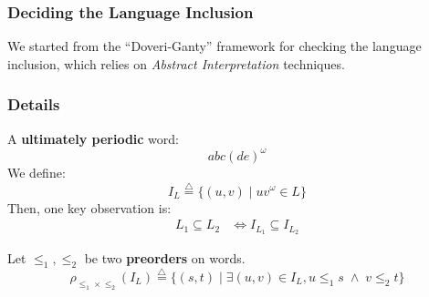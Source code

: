 \documentclass{beamer}
\begin{document}
\begin{frame}
\frametitle{Deciding the Language Inclusion}
We started from the ``Doveri-Ganty'' framework for checking the language inclusion,
which relies on \emph{Abstract Interpretation} techniques.

\begin{figure}[h]
	\centering
\end{figure}
\end{frame}



\begin{frame}
\frametitle{Details}
A \textbf{ultimately periodic} word:
\[ abc(de)^{\omega} \]
We define:
\[ I_{L} \overset{\triangle}{=} \{ (u,v) \;|\; uv ^{\omega} \in L\} \]
Then, one key observation is:
\begin{equation*}
\begin{split}
L_1 \subseteq L_2 & \Longleftrightarrow I_{L_1} \subseteq I_{L_2}
\end{split}
\end{equation*}

Let $\leq_1, \leq_2$ be two \textbf{preorders} on words.
\[ \rho_{\leq_1 \times \leq_2}(I_L) \overset{\triangle}{=} \{(s,t) \;|\; \exists (u,v) \in I_L, u \leq_1 s \; \wedge \; v \leq_2 t\} \]
\end{frame}
\end{document}
